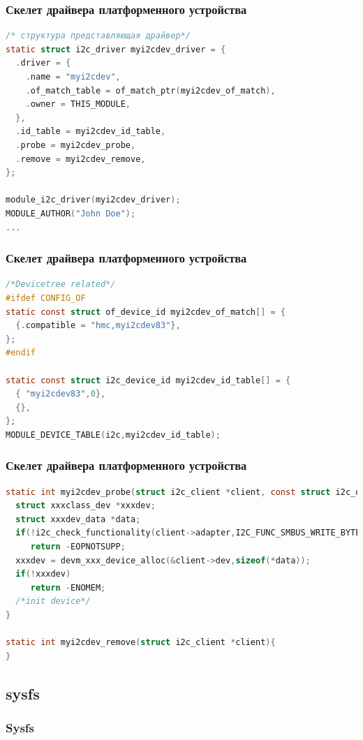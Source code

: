 \begin{frame}[fragile]
  \frametitle{Скелет драйвера платформенного устройства}
\begin{lstlisting}[language=C]
/* структура представляющая драйвер*/
static struct i2c_driver myi2cdev_driver = {
  .driver = {
    .name = "myi2cdev",
    .of_match_table = of_match_ptr(myi2cdev_of_match),
    .owner = THIS_MODULE,
  },
  .id_table = myi2cdev_id_table,
  .probe = myi2cdev_probe,
  .remove = myi2cdev_remove,
};

module_i2c_driver(myi2cdev_driver);
MODULE_AUTHOR("John Doe");
...
\end{lstlisting}
\end{frame}

\begin{frame}[fragile]
  \frametitle{Скелет драйвера платформенного устройства}
\begin{lstlisting}[language=C]
/*Devicetree related*/
#ifdef CONFIG_OF
static const struct of_device_id myi2cdev_of_match[] = {
  {.compatible = "hmc,myi2cdev83"},
};
#endif

static const struct i2c_device_id myi2cdev_id_table[] = {
  { "myi2cdev83",0},
  {},
};
MODULE_DEVICE_TABLE(i2c,myi2cdev_id_table);
\end{lstlisting}
\end{frame}

\begin{frame}[fragile]
  \frametitle{Скелет драйвера платформенного устройства}
\begin{lstlisting}[language=C]
static int myi2cdev_probe(struct i2c_client *client, const struct i2c_device_id *id){
  struct xxxclass_dev *xxxdev;
  struct xxxdev_data *data;
  if(!i2c_check_functionality(client->adapter,I2C_FUNC_SMBUS_WRITE_BYTE|..)
     return -EOPNOTSUPP;
  xxxdev = devm_xxx_device_alloc(&client->dev,sizeof(*data));
  if(!xxxdev)
     return -ENOMEM;
  /*init device*/
}

static int myi2cdev_remove(struct i2c_client *client){
}
\end{lstlisting}
\end{frame}

\subsection{sysfs}
\begin{frame}
  \frametitle{Sysfs}
\end{frame}
